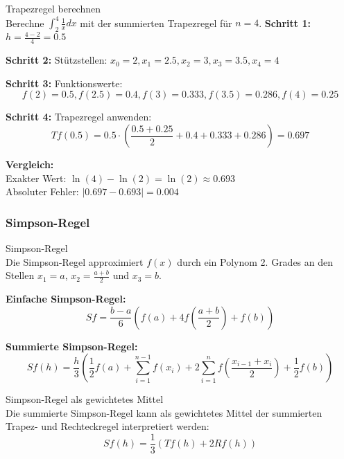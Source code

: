 \begin{example2}{Trapezregel berechnen}\\
Berechne $\int_2^4 \frac{1}{x} dx$ mit der summierten Trapezregel für $n = 4$.
\tcblower
\textbf{Schritt 1:} $h = \frac{4-2}{4} = 0.5$

\textbf{Schritt 2:} Stützstellen: $x_0 = 2, x_1 = 2.5, x_2 = 3, x_3 = 3.5, x_4 = 4$

\textbf{Schritt 3:} Funktionswerte:
$$f(2) = 0.5, f(2.5) = 0.4, f(3) = 0.333, f(3.5) = 0.286, f(4) = 0.25$$

\textbf{Schritt 4:} Trapezregel anwenden:
$$Tf(0.5) = 0.5 \cdot \left(\frac{0.5 + 0.25}{2} + 0.4 + 0.333 + 0.286\right) = 0.697$$

\textbf{Vergleich:}\\
 Exakter Wert: $\ln(4) - \ln(2) = \ln(2) \approx 0.693$\\
Absoluter Fehler: $|0.697 - 0.693| = 0.004$
\end{example2}

\raggedcolumns
\columnbreak

\subsubsection{Simpson-Regel}

\begin{definition}{Simpson-Regel}\\
Die Simpson-Regel approximiert $f(x)$ durch ein Polynom 2. Grades an den Stellen $x_1 = a$, $x_2 = \frac{a+b}{2}$ und $x_3 = b$.

\textbf{Einfache Simpson-Regel:}
$$Sf = \frac{b-a}{6} \left(f(a) + 4f\left(\frac{a+b}{2}\right) + f(b)\right)$$

\textbf{Summierte Simpson-Regel:}
$$Sf(h) = \frac{h}{3} \left(\frac{1}{2}f(a) + \sum_{i=1}^{n-1} f(x_i) + 2\sum_{i=1}^{n} f\left(\frac{x_{i-1} + x_i}{2}\right) + \frac{1}{2}f(b)\right)$$
\end{definition}

\begin{concept}{Simpson-Regel als gewichtetes Mittel}\\
Die summierte Simpson-Regel kann als gewichtetes Mittel der summierten Trapez- und Rechteckregel interpretiert werden:
$$Sf(h) = \frac{1}{3}(Tf(h) + 2Rf(h))$$
\end{concept}

